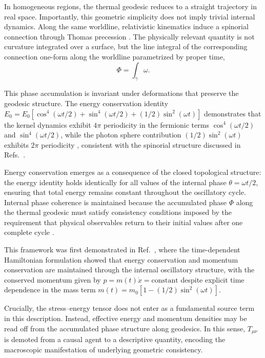\documentclass[%
 reprint,
 amsmath,amssymb,
 aps,
 prb,
]{revtex4-2}
\numberwithin{equation}{section}
\begin{document}
In homogeneous regions, the thermal geodesic reduces to a straight trajectory in real space. Importantly, this geometric simplicity does not imply trivial internal dynamics. Along the same worldline, relativistic kinematics induce a spinorial connection through Thomas precession \cite{Thomas1926,Jackson}. 
The physically relevant quantity is not curvature integrated over a surface,
but the line integral of the corresponding connection one-form
along the worldline parametrized by proper time,
\begin{equation}
\Phi = \int_{\gamma} \omega .
\end{equation}

This phase accumulation is invariant under deformations that preserve the geodesic structure. The energy conservation identity $E_0 = E_0[\cos^4(\omega t/2) + \sin^4(\omega t/2) + (1/2)\sin^2(\omega t)]$ demonstrates that the kernel dynamics exhibit $4\pi$ periodicity in the fermionic terms $\cos^4(\omega t/2)$ and $\sin^4(\omega t/2)$, while the photon sphere contribution $(1/2)\sin^2(\omega t)$ exhibits $2\pi$ periodicity \cite{hanamura17982104,hanamura17765136}, consistent with the spinorial structure discussed in Refs.~\cite{Sakurai,Nakahara}.

Energy conservation emerges as a consequence of the closed topological structure: the energy identity holds identically for all values of the internal phase $\theta = \omega t/2$, ensuring that total energy remains constant throughout the oscillatory cycle. Internal phase coherence is maintained because the accumulated phase $\Phi$ along the thermal geodesic must satisfy consistency conditions imposed by the requirement that physical observables return to their initial values after one complete cycle \cite{hanamura17765244}. 

This framework was first demonstrated in Ref.~\cite{hanamura17765200}, where the time-dependent Hamiltonian formulation showed that energy conservation and momentum conservation are maintained through the internal oscillatory structure, with the conserved momentum given by $p = m(t)\dot{x} = \text{constant}$ despite explicit time dependence in the mass term $m(t) = m_0[1 - (1/2)\sin^2(\omega t)]$.

Crucially, the stress--energy tensor does not enter as a fundamental source term in this description. Instead, effective energy and momentum densities may be read off from the accumulated phase structure along geodesics. In this sense, $T_{\mu\nu}$ is demoted from a causal agent to a descriptive quantity, encoding the macroscopic manifestation of underlying geometric consistency.
\end{document}
